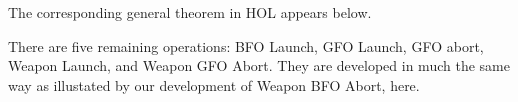 The corresponding general theorem in HOL appears below.

\begin{quote}
  \tealtext{[AlternateControlRepsKey1]}
  \HOLcTwoDrulesTheoremsAlternateControlRepsKeyOne
\end{quote}


There are five remaining operations: BFO Launch, GFO Launch, GFO
abort, Weapon Launch, and Weapon GFO Abort. They are developed in much
the same way as illustated by our development of Weapon BFO Abort,
here.



